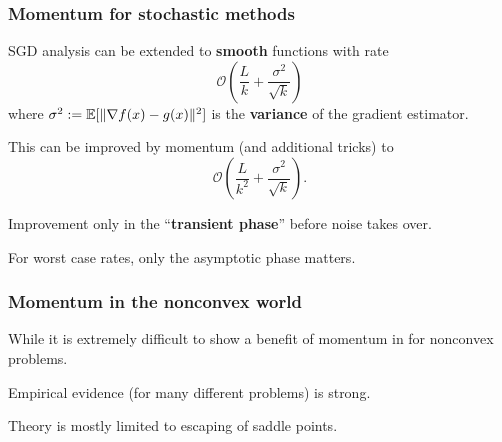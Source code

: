 \documentclass[aspectration=169]{beamer}
\begin{document}
\begin{frame}
  \frametitle{Momentum for stochastic methods}
  SGD analysis can be extended to \textbf{smooth} functions with rate
  \begin{equation}
    \mathcal{O}\left(\frac{L}{k} + \frac{\sigma^2}{\sqrt{k}}\right)
  \end{equation}
  where $\sigma^2:= \mathbb{E} [ \Vert \nabla f(x) - g(x) \Vert^2 ]$ is the \textbf{variance} of the gradient estimator.

  This can be improved by momentum (and additional tricks) to
  \begin{equation}
    \mathcal{O}\left(\frac{L}{k^2} + \frac{\sigma^2}{\sqrt{k}}\right).
  \end{equation}

  Improvement only in the ``\textbf{transient phase}'' before noise takes over.

  For worst case rates, only the asymptotic phase matters.

\end{frame}

\begin{frame}
  \frametitle{Momentum in the nonconvex world}

  While it is extremely difficult to show a benefit of momentum in for nonconvex problems.

  Empirical evidence (for many different problems) is strong.

  Theory is mostly limited to escaping of saddle points.

\end{frame}
\end{document}
